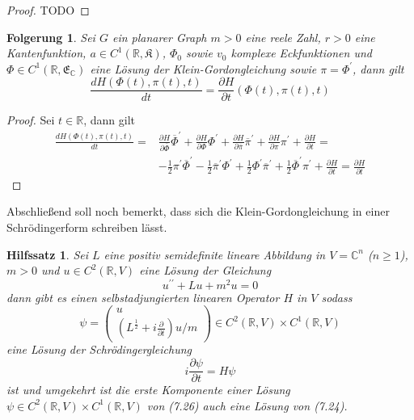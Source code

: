 \documentclass[11pt,a4paper,leqno]{report}
\newtheorem{lemma}[theorem]{Hilfssatz}
\newtheorem{corollary}[theorem]{Folgerung}
\numberwithin{equation}{chapter}
\begin{document}
\begin{proof}
TODO
\end{proof}

\begin{corollary}
Sei $G$ ein planarer Graph $m>0$ eine reele Zahl, $r>0$ eine Kantenfunktion, $a\in C^1(\mathbb{R}, \mathfrak{K})$, $\Phi_0$ sowie $v_0$ komplexe Eckfunktionen und $\Phi\in C^1(\mathbb{R}, \mathfrak{E}_\mathbb{C})$ eine L\"osung der Klein-Gordongleichung sowie $\pi=\Phi^\prime$, dann gilt
\begin{equation}
	\frac{dH(\Phi(t), \pi(t),t)}{dt} = \frac{\partial H}{\partial t}(\Phi(t), \pi(t),t)
\end{equation}
\end{corollary}
\begin{proof}
	Sei $t\in\mathbb{R}$, dann gilt
	\begin{align*}
\frac{dH(\Phi(t), \pi(t),t)}{dt}=&\frac{\partial H}{\partial \overline{\Phi}}\overline{\Phi}^\prime + \frac{\partial H}{\partial \Phi}\Phi^\prime +\frac{\partial H}{\partial \overline{\pi}}\overline{\pi}^\prime + \frac{\partial H}{\partial \pi}\pi^\prime + \frac{\partial H}{\partial t}=\\
&-\frac{1}{2}\pi^\prime\overline{\Phi}^\prime  -\frac{1}{2}\overline{\pi}^\prime\Phi^\prime +\frac{1}{2}\Phi^\prime\overline{\pi}^\prime + \frac{1}{2}\overline{\Phi}^\prime\pi^\prime + \frac{\partial H}{\partial t}=\frac{\partial H}{\partial t}
	\end{align*}
\end{proof}
\noindent
Abschlie\ss{}end soll noch bemerkt, dass sich die Klein-Gordongleichung in einer Schr\"odingerform schreiben l\"asst. 
\begin{lemma}
	Sei $L$ eine positiv semidefinite lineare Abbildung in $V=\mathbb{C}^n$ ($n\geq 1 $), $m>0$ und $u\in C^2(\mathbb{R}, V)$ eine L\"osung der Gleichung
\begin{equation}
	u^{\prime \prime} + Lu + m^2u= 0
\end{equation}
dann gibt es einen selbstadjungierten linearen Operator $H$ in $V$ sodass 
\begin{equation}
	\psi = \begin{pmatrix}
		u \\ (L^\frac{1}{2} + i \frac{\partial}{\partial t})u/m
	\end{pmatrix}\in C^2(\mathbb{R},V)\times C^1(\mathbb{R},V)
\end{equation}
eine L\"osung der Schrödingergleichung
\begin{equation}
	i\frac{\partial\psi}{\partial t} = H\psi
\end{equation}
ist und umgekehrt ist die erste Komponente einer L\"osung $\psi\in C^2(\mathbb{R},V)\times C^1(\mathbb{R},V)$ von (7.26) auch eine L\"osung von (7.24).
\end{lemma}
\end{document}
